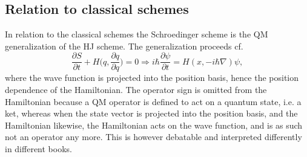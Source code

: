 \subsection*{Relation to classical schemes}
In relation to the classical schemes the Schroedinger scheme is the QM generalization of the HJ scheme. The generalization proceeds cf.
\begin{equation}
	\frac{\partial S}{\partial t}+H\bigg(q,\frac{\partial q}{\partial q}\bigg)=0\Rightarrow i\hbar \frac{\partial \psi}{\partial t}=H(x,-i\hbar\nabla)\psi,
\end{equation} 
where the wave function is projected into the position basis, hence the position dependence of the Hamiltonian. The operator sign is omitted from the Hamiltonian because a QM operator is defined to act on a quantum state, i.e. a ket, whereas when the state vector is projected into the position basis, and the Hamiltonian likewise, the Hamiltonian acts on the wave function, and is as such not an operator any more. This is however debatable and interpreted differently in different books. 

